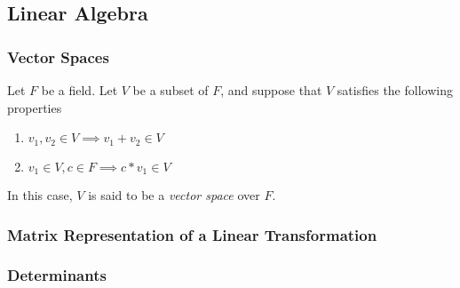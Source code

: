 \subsection{Linear Algebra}

\subsubsection{Vector Spaces}

\begin{definition}
    Let $F$ be a field. Let $V$ be a subset of $F$, and suppose that $V$
    satisfies the following properties
    \begin{enumerate}[i]
        \item $v_1, v_2 \in V \implies v_1 + v_2 \in V$
        \item $v_1 \in V, c \in F \implies c * v_1 \in V$
    \end{enumerate}
    In this case, $V$ is said to be a \emph{vector space} over $F$.
\end{definition}

\subsubsection{Matrix Representation of a Linear Transformation}

\subsubsection{Determinants}

\leavevmode \\


% 
% 
% 

